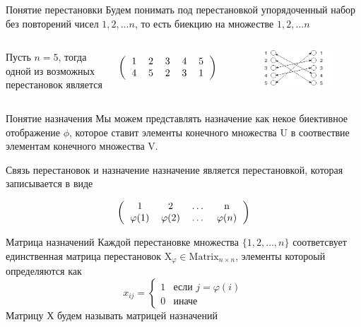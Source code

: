 \documentclass[12pt]{beamer}
\begin{document}
\begin{frame}{Понятие перестановки}
Будем понимать под перестановкой упорядоченный набор без повторений чисел $1, 2, \ldots n$, то есть
биекцию на множестве ${1, 2, \ldots n}$ \\
\begin{columns}
Пусть $n=5$, тогда одной из возможных перестановок является

\[
\left (
  \begin{tabular}{ccccc}
  1 & 2 & 3 & 4 & 5\\
  4 & 5 & 2 & 3 & 1
  \end{tabular}
\right )
\]

\begin{figure}
\includegraphics[scale=0.5]{premutation.png}
\end{figure}
\end{columns}
\end{frame}

\begin{frame}{Понятие назначения}
Мы можем
представлять назначение как некое биективное отображение $\phi$, которое ставит
элементы конечного множества $\mathrm{U}$ в соотвествие элементам конечного
множества $\mathrm{V}$.
\end{frame}

\begin{frame}{Связь перестановок и назначение}
назначение является перестановкой, которая записывается
в виде

\[
\left (
  \begin{tabular}{cccc}
  1 & 2 & \ldots & n\\
  $\varphi (1)$ & $\varphi (2)$ & \ldots & $\varphi (n)$
  \end{tabular}
\right )
\]
\end{frame}

\begin{frame}{Матрица назначений}
Каждой перестановке множества $\{1, 2, \ldots , n \}$ соответсвует единственная матрица
перестановок $\mathrm{X}_\varphi \in \mathrm{Matrix}_{n \times n}$, элементы котороый определяются как
\[
x_{ij} =
 \begin{cases}
   1 & \text{если } j = \varphi(i) \\
   0 & \text{иначе}
 \end{cases}
\]
Матрицу Х будем называть матрицей назначений
\end{frame}
\end{document}
